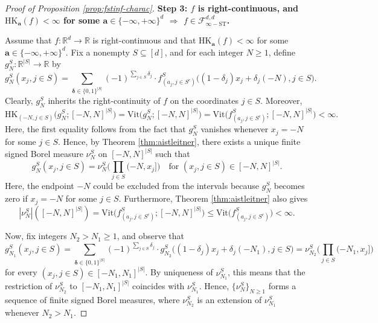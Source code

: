 \documentclass[10pt]{article}
\newcommand{\R}{{\mathbb R}}
\newcommand{\fstinfd}{{\mathcal{F}^{d, d}_{\infty-\text{ST}}}}
\newcommand{\vit}{{\text{Vit}}}
\newcommand{\hk}{{\text{HK}}}
\newcommand{\abf}{{\mathbf{a}}}
\newcommand{\deltabf}{{\boldsymbol{\delta}}}
\begin{document}
\begin{proof}[Proof of Proposition \ref{prop:fstinf-charac}]
\textbf{Step 3: $f$ is right-continuous, and 
$\hk_{\abf}(f) < \infty$ for some $\abf \in \{-\infty, +\infty\}^d$ 
$\Rightarrow$ $f \in \fstinfd$.}

Assume that $f: \R^d \to \R$ is right-continuous and that 
$\hk_{\abf}(f) < \infty$ for some $\abf \in \{-\infty, +\infty\}^d$. 
Fix a nonempty $S \subseteq [d]$, and for each integer $N \ge 1$, 
define $g^S_N: \R^{|S|} \to \R$ by
\begin{equation*}
    g^S_N(x_j, j \in S) = \sum_{\deltabf \in \{0, 1\}^{|S|}}
    (-1)^{\sum_{j \in S} \delta_j} \cdot 
    f^S_{(a_j, j \in S^c)}\big((1 - \delta_j) x_j + \delta_j (-N), 
    j \in S\big).
\end{equation*}
Clearly, $g^S_N$ inherits the right-continuity of $f$ on the 
coordinates $j \in S$. Moreover,
\begin{equation*}
    \hk_{(-N, j \in S)}
    \big(g^S_N; [-N, N]^{|S|}\big) 
    = \vit\big(g^S_N; [-N, N]^{|S|}\big) 
    = \vit\big(f^S_{(a_j, j \in S^c)}; [-N, N]^{|S|}\big) < \infty.
\end{equation*}
Here, the first equality follows from the fact that $g^S_N$ vanishes
whenever $x_j = -N$ for some $j \in S$. Hence, by 
Theorem \ref{thm:aistleitner}, there exists a unique finite signed 
Borel measure $\nu^S_N$ on $[-N, N]^{|S|}$ such that
\begin{equation*}
    g^S_N(x_j, j \in S) = \nu^S_N\Big(\prod_{j \in S} (-N, x_j]\Big)
    \quad \text{for } (x_j, j \in S) \in [-N, N]^{|S|}.
\end{equation*}
Here, the endpoint $-N$ could be excluded from the intervals because 
$g^S_N$ becomes zero if $x_j = -N$ for some $j \in S$.
Furthermore, Theorem \ref{thm:aistleitner} also gives
\begin{equation*}
    |\nu^S_N|([-N, N]^{|S|}) 
    =  \vit\big(f^S_{(a_j, j \in S^c)}; [-N, N]^{|S|}\big)
    \le \vit\big(f^S_{(a_j, j \in S^c)}\big) < \infty.
\end{equation*}

Now, fix integers $N_2 > N_1 \ge 1$, and observe that
\begin{equation*}
    g^S_{N_1}(x_j, j \in S) 
    = \sum_{\deltabf \in \{0, 1\}^{|S|}}
    (-1)^{\sum_{j \in S} \delta_j} \cdot 
    g^S_{N_2}\big((1 - \delta_j) x_j + \delta_j (-N_1), j \in S\big)
    = \nu^S_{N_2}\Big(\prod_{j \in S} (-N_1, x_j]\Big)
\end{equation*}
for every $(x_j, j \in S) \in [-N_1, N_1]^{|S|}$.
By uniqueness of $\nu^S_{N_1}$, this means that the restriction of 
$\nu^S_{N_2}$ to $[-N_1, N_1]^{|S|}$ coincides with $\nu^S_{N_1}$. 
Hence, $\{\nu^S_{N}\}_{N \ge 1}$ forms a sequence of finite signed Borel 
measures, where $\nu^S_{N_2}$ is an extension of $\nu^S_{N_1}$ whenever 
$N_2 > N_1$.


\end{proof}
\end{document}
